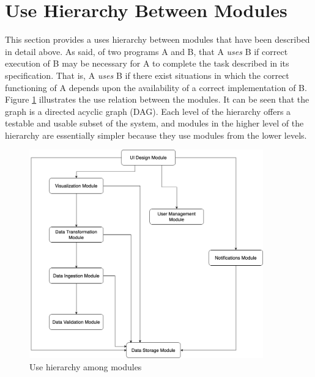 \documentclass[12pt, titlepage]{article}
\begin{document}
\section{Use Hierarchy Between Modules} \label{SecUse}
This section provides a uses hierarchy between modules that have been described in detail 
above. As \citet{Parnas1978} said, of two programs A and B, that A {\em uses} B if correct 
execution of B may be necessary for A to complete the task described in its specification.
That is, A {\em uses} B if there exist situations in which the correct functioning of A 
depends upon the availability of a correct implementation of B.\\
\newline
Figure \ref{FigUH} illustrates the use relation between the modules. It can be seen that 
the graph is a directed acyclic graph (DAG). Each level of the hierarchy offers a testable
and usable subset of the system, and modules in the higher level of the hierarchy are 
essentially simpler because they use modules from the lower levels.

\begin{figure}[H]
\centering
\includegraphics[width=0.9\textwidth]{Diagrams/uses hierarchy.png}
\caption{Use hierarchy among modules}
\label{FigUH}
\end{figure}
\end{document}
